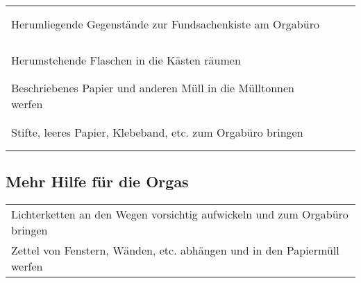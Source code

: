 \documentclass[14pt,parskip=full+]{scrartcl}
\newcommand{\checkfield}{~ \hfill ~\raisebox{-5pt}{\tikz\node[draw,minimum width=16.8pt,minimum height=16.8pt]{};}}
\begin{document}

\def\arraystretch{1.3}

\begin{tabularx}{\textwidth}{Xc}
 Herumliegende Gegenstände zur Fundsachenkiste am Orgabüro & \checkfield \\
 Herumstehende Flaschen in die Kästen räumen & \checkfield \\
 Beschriebenes Papier und anderen Müll in die Mülltonnen werfen & \checkfield \\
 Stifte, leeres Papier, Klebeband, etc. zum Orgabüro bringen & \checkfield \\
\end{tabularx}

\subsection*{Mehr Hilfe für die Orgas}
\begin{tabularx}{\textwidth}{X}
 Lichterketten an den Wegen vorsichtig aufwickeln und zum Orgabüro bringen \\
 Zettel von Fenstern, Wänden, etc. abhängen und in den Papiermüll werfen \\
\end{tabularx}
\end{document}
